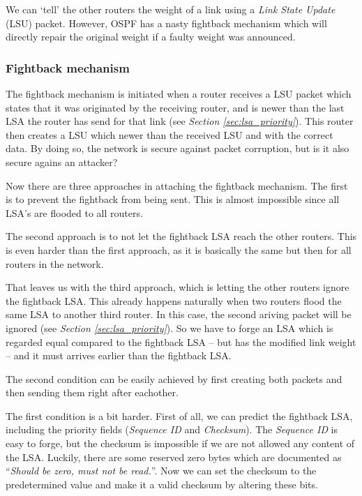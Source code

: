 \documentclass[11pt,a4paper,oneside]{article}
\newcommand{\lsubsubsection}[2]{\subsubsection{#1}\label{sec:#2}}
\begin{document}
    			We can `tell' the other routers the weight of a link using a \textit{Link State Update} (LSU) packet. However, OSPF has a nasty fightback mechanism which will directly repair the original weight if a faulty weight was announced.
    			
    			\lsubsubsection{Fightback mechanism}{fightback}
    				The fightback mechanism is initiated when a router receives a LSU packet which states that it was originated by the receiving router, and is newer than the last LSA the router has send for that link (see \textit{Section \ref{sec:lsa_priority}}). This router then creates a LSU which newer than the received LSU and with the correct data. By doing so, the network is secure against packet corruption, but is it also secure agains an attacker?
    				
    				Now there are three approaches in attaching the fightback mechanism. The first is to prevent the fightback from being sent. This is almost impossible since all LSA's are flooded to all routers.
    				
    				The second approach is to not let the fightback LSA reach the other routers. This is even harder than the first approach, as it is basically the same but then for all routers in the network.
    				
    				That leaves us with the third approach, which is letting the other routers ignore the fightback LSA. This already happens naturally when two routers flood the same LSA to another third router. In this case, the second ariving packet will be ignored (see \textit{Section \ref{sec:lsa_priority}}). So we have to forge an LSA which is regarded equal compared to the fightback LSA -- but has the modified link weight -- and it must arrives earlier than the fightback LSA.
    				
    				The second condition can be easily achieved by first creating both packets and then sending them right after eachother.
    				
    				The first condition is a bit harder. First of all, we can predict the fightback LSA, including the priority fields (\textit{Sequence ID} and \textit{Checksum}). The \textit{Sequence ID} is easy to forge, but the checksum is impossible if we are not allowed any content of the LSA. Luckily, there are some reserved zero bytes which are documented as ``\textit{Should be zero, must not be read.}''\cite{ospfv3-5340}. Now we can set the checksum to the predetermined value and make it a valid checksum by altering these bits.
    				
\end{document}
